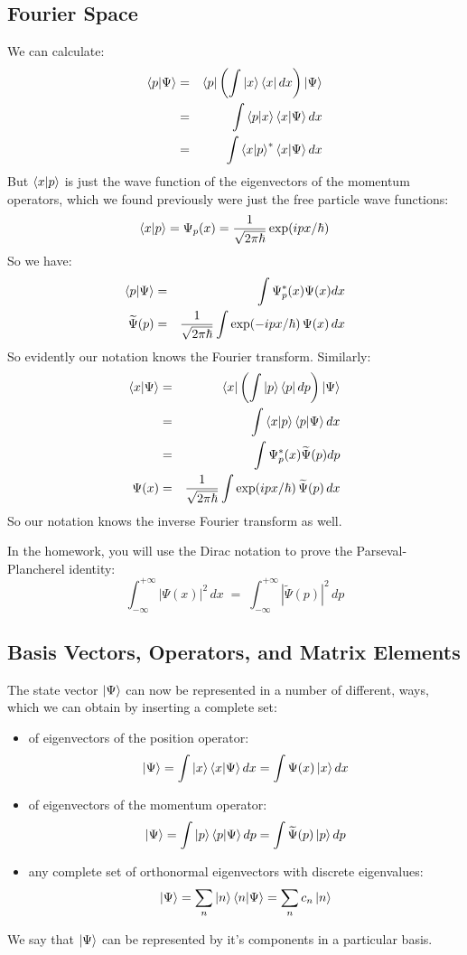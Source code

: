 \documentclass[12pt]{book}
\begin{document}
\subsection{Fourier Space}

We can calculate:
\begin{eqnarray*}
  \braket{p|\Psi} &=& \braket{p|\left( \int \ket{x} \bra{x} dx \right)|\Psi} \\
  &=& \int \braket{p|x} \braket{x|\Psi} dx \\
  &=& \int \braket{x|p}^* \braket{x|\Psi} dx \\
\end{eqnarray*}
But $\braket{x|p}$ is just the wave function of the eigenvectors of the momentum operators, which we found previously were just the free particle wave functions:
$$\braket{x|p} = \Psi_p(x) = \frac{1}{\sqrt{2\pi \hbar}} \exp(ipx/\hbar)$$
So we have:
\begin{eqnarray*}
  \braket{p|\Psi} &=& \int \Psi^*_p(x) \Psi(x) dx \\
  \widetilde{\Psi}(p) &=& \frac{1}{\sqrt{2\pi\hbar}}\int \exp(-ipx/\hbar) \, \Psi(x) \, dx \\
\end{eqnarray*}
So evidently our notation knows the Fourier transform.  Similarly:
\begin{eqnarray*}
  \braket{x|\Psi} &=& \braket{x|\left( \int \ket{p} \bra{p} dp \right)|\Psi} \\
  &=& \int \braket{x|p} \braket{p|\Psi} dx \\
  &=& \int \Psi^*_p(x) \widetilde{\Psi}(p) dp \\
  \Psi(x) &=& \frac{1}{\sqrt{2\pi\hbar}}\int \exp(ipx/\hbar) \, \widetilde{\Psi}(p) \, dx \\
\end{eqnarray*}
So our notation knows the inverse Fourier transform as well.

In the homework, you will use the Dirac notation to prove the Parseval-Plancherel identity:
$$\int_{-\infty}^{+\infty} |\Psi(x)|^2 \, dx \; = \; \int_{-\infty}^{+\infty} |\widetilde{\Psi}(p)|^2 \, dp$$

\subsection{Basis Vectors, Operators, and Matrix Elements}

The state vector $\ket{\Psi}$ can now be represented in a number of different, ways, which we can obtain by inserting a complete set:
\begin{itemize}
\item of eigenvectors of the position operator:
 $$\ket{\Psi} = \int \ket{x}\braket{x|\Psi} dx = \int \Psi(x) \ket{x} dx $$
\item of eigenvectors of the momentum operator:
  $$\ket{\Psi} = \int \ket{p}\braket{p|\Psi} dp = \int \widetilde{\Psi}(p) \ket{p} dp $$
\item any complete set of orthonormal eigenvectors with discrete eigenvalues:
 $$\ket{\Psi} = \sum_n \ket{n}\braket{n|\Psi} = \sum_n c_n \ket{n}$$
\end{itemize}
We say that $\ket{\Psi}$ can be represented by it's components in a particular basis.
\end{document}
